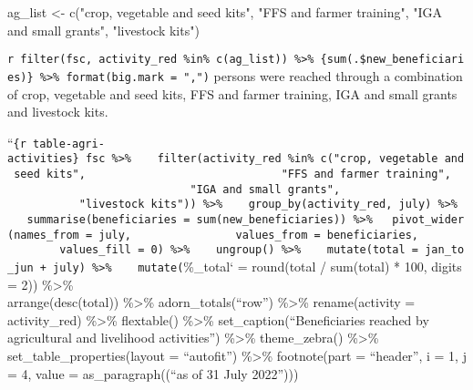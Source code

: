 \documentclass[
]{article}
\newenvironment{Shaded}{\begin{snugshade}}{\end{snugshade}}
\newcommand{\NormalTok}[1]{#1}
\begin{document}
\begin{Shaded}
\begin{Highlighting}[]
\NormalTok{ag\_list \textless{}{-} c("crop, vegetable and seed kits",}
\NormalTok{             "FFS and farmer training",}
\NormalTok{             "IGA and small grants",}
\NormalTok{             "livestock kits")}

\end{Highlighting}
\end{Shaded}

\texttt{r\ filter(fsc,\ activity\_red\ \%in\%\ c(ag\_list))\ \%\textgreater{}\%\ \{sum(.\$new\_beneficiaries)\}\ \%\textgreater{}\%\ format(big.mark\ =\ ",")}
persons were reached through a combination of crop, vegetable and seed
kits, FFS and farmer training, IGA and small grants and livestock kits.

``\texttt{\{r\ table-agri-activities\}\ fsc\ \%\textgreater{}\%\ \ \ \ filter(activity\_red\ \%in\%\ c("crop,\ vegetable\ and\ seed\ kits",\ \ \ \ \ \ \ \ \ \ \ \ \ \ \ \ \ \ \ \ \ \ \ \ \ \ \ \ \ \ "FFS\ and\ farmer\ training",\ \ \ \ \ \ \ \ \ \ \ \ \ \ \ \ \ \ \ \ \ \ \ \ \ \ \ \ \ \ "IGA\ and\ small\ grants",\ \ \ \ \ \ \ \ \ \ \ \ \ \ \ \ \ \ \ \ \ \ \ \ \ \ \ \ \ \ "livestock\ kits"))\ \%\textgreater{}\%\ \ \ \ group\_by(activity\_red,\ july)\ \%\textgreater{}\%\ \ \ \ summarise(beneficiaries\ =\ sum(new\_beneficiaries))\ \%\textgreater{}\%\ \ \ pivot\_wider(names\_from\ =\ july,\ \ \ \ \ \ \ \ \ \ \ \ \ \ \ \ values\_from\ =\ beneficiaries,\ \ \ \ \ \ \ \ \ \ \ \ \ \ \ values\_fill\ =\ 0)\ \%\textgreater{}\%\ \ \ \ ungroup()\ \%\textgreater{}\%\ \ \ \ mutate(total\ =\ jan\_to\_jun\ +\ july)\ \%\textgreater{}\%\ \ \ \ mutate(}\%\_total`
= round(total / sum(total) * 100, digits = 2)) \%\textgreater\%\\
arrange(desc(total)) \%\textgreater\% adorn\_totals(``row'')
\%\textgreater\% rename(activity = activity\_red) \%\textgreater\%
flextable() \%\textgreater\% set\_caption(``Beneficiaries reached by
agricultural and livelihood activities'') \%\textgreater\%
theme\_zebra() \%\textgreater\% set\_table\_properties(layout =
``autofit'') \%\textgreater\% footnote(part = ``header'', i = 1, j = 4,
value = as\_paragraph((``as of 31 July 2022'')))
\end{document}
